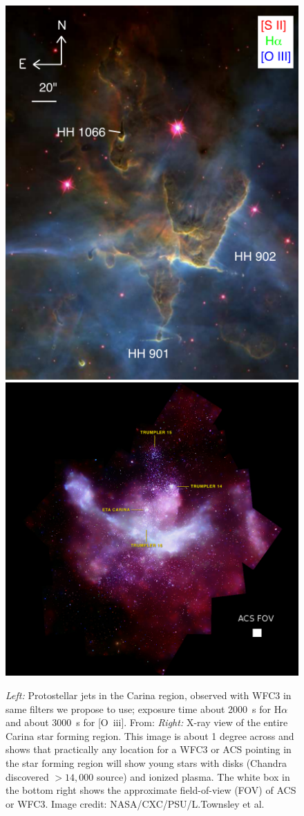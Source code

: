 \documentclass[12pt]{article}
\begin{document}
\begin{figure}
    \centering
    \includegraphics[width=.45\textwidth]{reiter13_fig3.png}
    \includegraphics[width=.54\textwidth]{carina_xray_label.jpg}
    \caption{\emph{Left:} Protostellar jets in the Carina region, observed with WFC3 in same filters we propose to use; exposure time about 2000~s for H$\alpha$ and about 3000~s for [O~{\sc iii}]. From: \citet{2013MNRAS.433.2226R} \emph{Right:} X-ray view of the entire Carina star forming region. This image is about 1 degree across and shows that practically any location for a WFC3 or ACS pointing in the star forming region will show young stars with disks (Chandra discovered $> 14,000$ source) and ionized plasma. The white box in the bottom right shows the approximate field-of-view (FOV) of ACS or WFC3. Image credit: NASA/CXC/PSU/L.Townsley et al.}
    \label{fig:reiter}
\end{figure}
\end{document}
